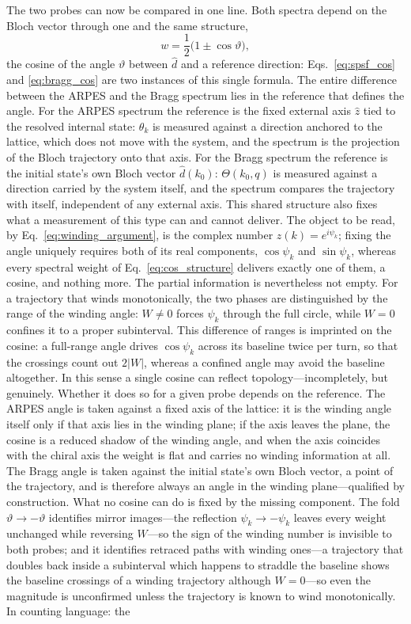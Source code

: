\documentclass[onecolumn,aps,prl,superscriptaddress,longbibliography]{revtex4-2}
\begin{document}
The two probes can now be compared in one line. Both spectra depend on the Bloch vector through one and the same structure,
\begin{equation}\label{eq:cos_structure}
  w=\frac{1}{2}\bigl(1\pm\cos\vartheta\bigr),
\end{equation}
the cosine of the angle $\vartheta$ between $\hat d$ and a reference direction: Eqs.~\eqref{eq:spsf_cos} and \eqref{eq:bragg_cos} are two instances of this single formula. The entire difference between the ARPES and the Bragg spectrum lies in the reference that defines the angle. For the ARPES spectrum the reference is the fixed external axis $\hat z$ tied to the resolved internal state: $\theta_k$ is measured against a direction anchored to the lattice, which does not move with the system, and the spectrum is the projection of the Bloch trajectory onto that axis. For the Bragg spectrum the reference is the initial state's own Bloch vector $\hat d(k_0)$: $\Theta(k_0,q)$ is measured against a direction carried by the system itself, and the spectrum compares the trajectory with itself, independent of any external axis. This shared structure also fixes what a measurement of this type can and cannot deliver. The object to be read, by Eq.~\eqref{eq:winding_argument}, is the complex number $z(k)=e^{i\psi_k}$; fixing the angle uniquely requires both of its real components, $\cos\psi_k$ and $\sin\psi_k$, whereas every spectral weight of Eq.~\eqref{eq:cos_structure} delivers exactly one of them, a cosine, and nothing more. The partial information is nevertheless not empty. For a trajectory that winds monotonically, the two phases are distinguished by the range of the winding angle: $W\neq0$ forces $\psi_k$ through the full circle, while $W=0$ confines it to a proper subinterval. This difference of ranges is imprinted on the cosine: a full-range angle drives $\cos\psi_k$ across its baseline twice per turn, so that the crossings count out $2|W|$, whereas a confined angle may avoid the baseline altogether. In this sense a single cosine can reflect topology---incompletely, but genuinely. Whether it does so for a given probe depends on the reference. The ARPES angle is taken against a fixed axis of the lattice: it is the winding angle itself only if that axis lies in the winding plane; if the axis leaves the plane, the cosine is a reduced shadow of the winding angle, and when the axis coincides with the chiral axis the weight is flat and carries no winding information at all. The Bragg angle is taken against the initial state's own Bloch vector, a point of the trajectory, and is therefore always an angle in the winding plane---qualified by construction. What no cosine can do is fixed by the missing component. The fold $\vartheta\to-\vartheta$ identifies mirror images---the reflection $\psi_k\to-\psi_k$ leaves every weight unchanged while reversing $W$---so the sign of the winding number is invisible to both probes; and it identifies retraced paths with winding ones---a trajectory that doubles back inside a subinterval which happens to straddle the baseline shows the baseline crossings of a winding trajectory although $W=0$---so even the magnitude is unconfirmed unless the trajectory is known to wind monotonically. In counting language: the 
\end{document}
